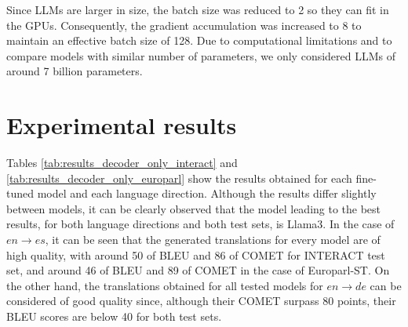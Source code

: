 \documentclass[11pt,english,listoffigures,listoftables]{tfgetsinf}
\begin{document}
Since LLMs are larger in size, the batch size was reduced to 2 so they can fit in the GPUs. Consequently, the gradient accumulation was increased to 8 to maintain an effective batch size of 128. Due to computational limitations and to compare models with similar number of parameters, we only considered LLMs of around 7 billion parameters.

\section{Experimental results}

Tables \ref{tab:results_decoder_only_interact} and \ref{tab:results_decoder_only_europarl} show the results obtained for each fine-tuned model and each language direction. Although the results differ slightly between models, it can be clearly observed that the model leading to the best results, for both language directions and both test sets, is Llama3. In the case of $en \rightarrow es$, it can be seen that the generated translations for every model are of high quality, with around 50 of BLEU and 86 of COMET for INTERACT test set, and around 46 of BLEU and 89 of COMET in the case of Europarl-ST. On the other hand, the translations obtained for all tested models for $en \rightarrow de$ can be considered of good quality since, although their COMET surpass 80 points, their BLEU scores are below 40 for both test sets. 


\end{document}
